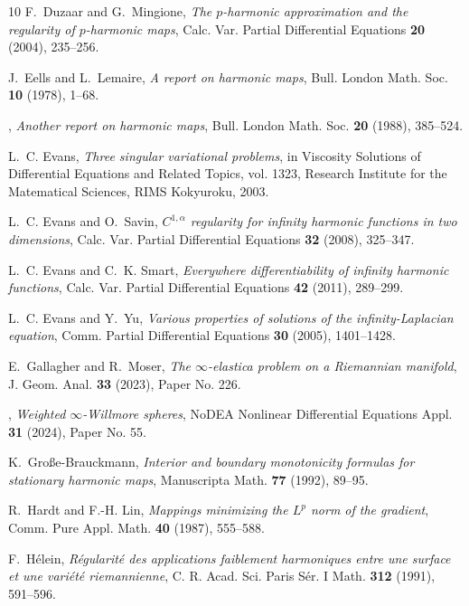 \documentclass[a4paper]{article}
\theoremstyle{definition}
\theoremstyle{remark}
\begin{document}
\begin{thebibliography}{10}
F.~Duzaar and G.~Mingione, \emph{The {$p$}-harmonic approximation and the
  regularity of {$p$}-harmonic maps}, Calc. Var. Partial Differential Equations
  \textbf{20} (2004), 235--256.

J.~Eells and L.~Lemaire, \emph{A report on harmonic maps}, Bull. London Math.
  Soc. \textbf{10} (1978), 1--68.

\bysame, \emph{Another report on harmonic maps}, Bull. London Math. Soc.
  \textbf{20} (1988), 385--524.

L.~C. Evans, \emph{Three singular variational problems}, in Viscosity Solutions
  of Differential Equations and Related Topics, vol. 1323, Research Institute
  for the Matematical Sciences, RIMS Kokyuroku, 2003.

L.~C. Evans and O.~Savin, \emph{{$C^{1,\alpha}$} regularity for infinity
  harmonic functions in two dimensions}, Calc. Var. Partial Differential
  Equations \textbf{32} (2008), 325--347.

L.~C. Evans and C.~K. Smart, \emph{Everywhere differentiability of infinity
  harmonic functions}, Calc. Var. Partial Differential Equations \textbf{42}
  (2011), 289--299.

L.~C. Evans and Y.~Yu, \emph{Various properties of solutions of the
  infinity-{L}aplacian equation}, Comm. Partial Differential Equations
  \textbf{30} (2005), 1401--1428.

E.~Gallagher and R.~Moser, \emph{The {$\infty $}-elastica problem on a
  {R}iemannian manifold}, J. Geom. Anal. \textbf{33} (2023), Paper No. 226.

\bysame, \emph{Weighted {$\infty$}-{W}illmore spheres}, NoDEA Nonlinear
  Differential Equations Appl. \textbf{31} (2024), Paper No. 55.

K.~Gro{\ss}e-Brauckmann, \emph{Interior and boundary monotonicity formulas for
  stationary harmonic maps}, Manuscripta Math. \textbf{77} (1992), 89--95.

R.~Hardt and F.-H. Lin, \emph{Mappings minimizing the {$L^p$} norm of the
  gradient}, Comm. Pure Appl. Math. \textbf{40} (1987), 555--588.

F.~H\'elein, \emph{R\'egularit\'e des applications faiblement harmoniques entre
  une surface et une vari\'et\'e riemannienne}, C. R. Acad. Sci. Paris S{\'e}r.
  I Math. \textbf{312} (1991), 591--596.


\end{thebibliography}
\end{document}
